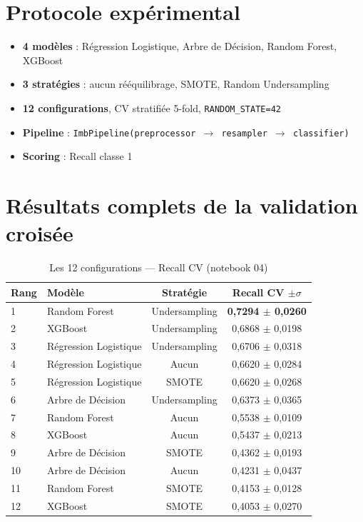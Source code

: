 \documentclass[11pt,a4paper,twoside,openright]{report}
\begin{document}
\section{Protocole expérimental}

\begin{itemize}
  \item \textbf{4 modèles} : Régression Logistique, Arbre de Décision, Random Forest, XGBoost
  \item \textbf{3 stratégies} : aucun rééquilibrage, SMOTE, Random Undersampling
  \item \textbf{12 configurations}, CV stratifiée 5-fold, \texttt{RANDOM\_STATE=42}
  \item \textbf{Pipeline} : \texttt{ImbPipeline(preprocessor $\rightarrow$ resampler $\rightarrow$ classifier)}
  \item \textbf{Scoring} : Recall classe 1
\end{itemize}

\section{Résultats complets de la validation croisée}

\begin{table}[H]
  \centering
  \caption{Les 12 configurations — Recall CV (notebook 04)}
  \label{tab:cv12}
  \small
  \begin{tabular}{llcc}
    \toprule
    \textbf{Rang} & \textbf{Modèle} & \textbf{Stratégie} & \textbf{Recall CV $\pm\sigma$} \\
    \midrule
    1  & Random Forest         & Undersampling  & \textbf{0,7294 $\pm$ 0,0260} \\
    2  & XGBoost               & Undersampling  & 0,6868 $\pm$ 0,0198 \\
    3  & Régression Logistique & Undersampling  & 0,6706 $\pm$ 0,0318 \\
    4  & Régression Logistique & Aucun          & 0,6620 $\pm$ 0,0284 \\
    5  & Régression Logistique & SMOTE          & 0,6620 $\pm$ 0,0268 \\
    6  & Arbre de Décision     & Undersampling  & 0,6373 $\pm$ 0,0365 \\
    7  & Random Forest         & Aucun          & 0,5538 $\pm$ 0,0109 \\
    8  & XGBoost               & Aucun          & 0,5437 $\pm$ 0,0213 \\
    9  & Arbre de Décision     & SMOTE          & 0,4362 $\pm$ 0,0193 \\
    10 & Arbre de Décision     & Aucun          & 0,4231 $\pm$ 0,0437 \\
    11 & Random Forest         & SMOTE          & 0,4153 $\pm$ 0,0128 \\
    12 & XGBoost               & SMOTE          & 0,4053 $\pm$ 0,0270 \\
    \bottomrule
  \end{tabular}
\end{table}
\end{document}
